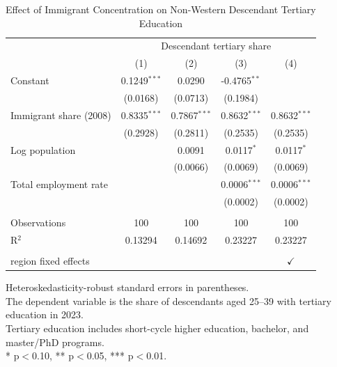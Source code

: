 \begin{table}[htbp]
   \caption{\label{tab:education} Effect of Immigrant Concentration on Non-Western Descendant Tertiary Education}
   \bigskip
   \centering
   \begin{tabular}{lcccc}
      \toprule
       & \multicolumn{4}{c}{Descendant tertiary share}\\
                             & (1)            & (2)            & (3)            & (4)\\  
      \midrule 
      Constant               & 0.1249$^{***}$ & 0.0290         & -0.4765$^{**}$ &   \\   
                             & (0.0168)       & (0.0713)       & (0.1984)       &   \\   
      Immigrant share (2008) & 0.8335$^{***}$ & 0.7867$^{***}$ & 0.8632$^{***}$ & 0.8632$^{***}$\\   
                             & (0.2928)       & (0.2811)       & (0.2535)       & (0.2535)\\   
      Log population         &                & 0.0091         & 0.0117$^{*}$   & 0.0117$^{*}$\\   
                             &                & (0.0066)       & (0.0069)       & (0.0069)\\   
      Total employment rate  &                &                & 0.0006$^{***}$ & 0.0006$^{***}$\\   
                             &                &                & (0.0002)       & (0.0002)\\   
       \\
      Observations           & 100            & 100            & 100            & 100\\  
      R$^2$                  & 0.13294        & 0.14692        & 0.23227        & 0.23227\\  
       \\
      region fixed effects   &                &                &                & $\checkmark$\\   
      \bottomrule
   \end{tabular}
   
   \par \raggedright 
   Heteroskedasticity-robust standard errors in parentheses.\\
   The dependent variable is the share of descendants aged 25--39 with tertiary education in 2023.\\
   Tertiary education includes short-cycle higher education, bachelor, and master/PhD programs.\\
   * p$<$0.10, ** p$<$0.05, *** p$<$0.01.
\end{table}
